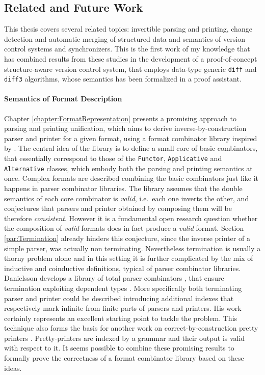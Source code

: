 \documentclass[../Thesis.tex]{subfiles}
\begin{document}
\subsection{Related and Future Work}
This thesis covers several related topics: invertible parsing and printing, change detection and automatic merging of structured data and semantics of version control systems and synchronizers.  This is the first work of my knowledge that has combined results from these studies in the development of a proof-of-concept structure-aware 
version control system, that employs data-type generic \texttt{diff} and
\texttt{diff3} algorithms, whose semantics has been formalized in
a proof assistant.

\paragraph{Semantics of Format Description}
Chapter \ref{chapter:FormatRepresentation} presents a promising approach
to parsing and printing unification, which aims to derive inverse-by-construction parser and printer for a given format, using
a format combinator library inspired by \cite{Rendel10ISD}.
The central idea of the library is to define a small core of basic combinators,
that essentially correspond to those of the \texttt{Functor}, \texttt{Applicative} and \texttt{Alternative} classes, which embody both the parsing and printing semantics at once. 
Complex formats are described combining the basic combinators just like
it happens in parser combinator libraries.
The library assumes that the double semantics of each core combinator
is \emph{valid}, i.e.\ each one inverts the other, and conjectures that
parsers and printer obtained by composing them will be therefore
\emph{consistent}.
However it is a fundamental open research question whether the composition
of \emph{valid} formats does in fact produce a \emph{valid} format.
Section \ref{par:Termination} already hinders this conjecture,
since the inverse printer of a simple parser, was actually
non terminating. 
Nevertheless termination is usually a thorny problem alone and
in this setting it is further complicated by the mix
of inductive and coinductive definitions, typical of
parser combinator libraries.
Danielsson develops a library of total parser combinators
\cite{TotalParserCombinator}, that ensure termination exploiting 
dependent types \cite{TotalParserCombinator}.
More specifically both terminating parser and printer
could be described introducing additional indexes that respectively
mark infinite from finite parts of parsers and printers.
His work certainly represents an excellent starting point to tackle
the problem. 
This technique also forms the basis for another work on 
correct-by-construction pretty printers \cite{CorrectByConstruction}.
Pretty-printers are indexed by a grammar and their output is valid with respect to it.
It seems possible to combine these promising results to formally prove
the correctness of a format combinator library based on these ideas.
\end{document}
